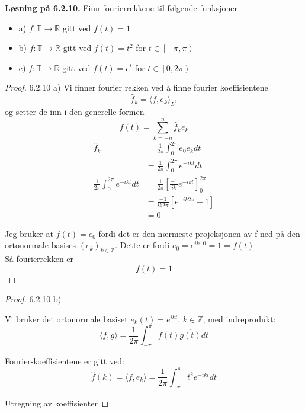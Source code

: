 \documentclass[a4paper,norsk]{article}
\newenvironment{oppgave}[1]%
	{\trivlist{}\item\relax\textbf{Løsning på #1.}\medspace}%
	{\endtrivlist}
\begin{document}
\begin{oppgave}{6.2.10}
Finn fourierrekkene til følgende funksjoner
\begin{itemize}
  \item a) $ f: \mathbb{T} \rightarrow \mathbb{R} $ gitt ved $ f(t) = 1 $  
  \item b) $ f: \mathbb{T} \rightarrow \mathbb{R} $ gitt ved $ f(t) = t^2 $ for $ t \in \left[ -\pi, \pi \right)  $   
  \item c) $ f: \mathbb{T} \rightarrow \mathbb{R} $ gitt ved $ f(t) = e^{t}  $ for $ t \in \left[ 0, 2 \pi \right) $ 
\end{itemize}


\begin{proof}{6.2.10 a)}
Vi finner fourier rekken ved å finne fourier koeffisientene
\[
    \hat{f}_k = \langle f, e_k \rangle_{ L^2 } 
\]
og setter de inn i den generelle formen
\[
    f(t) = \sum_{ k =-n }^{ n } \hat{f}_k e_k
\]
\begin{align*}
  \hat{f}_k &= \frac{ 1 }{ 2 \pi } \int_{0}^{2 \pi 
  } e_0 \overline{e_k} dt \\
  &= \frac{ 1 }{ 2 \pi  }  \int_{0}^{2 \pi } e^{-ikt} dt \\  
  \frac{ 1 }{ 2 \pi  } \int_{0 }^{2 \pi } e^{-ikt} dt &=   \frac{ 1 }{ 2 \pi  } \left[ \frac{ -1 }{ ik } e^{-ikt}  \right]  _0^{2 \pi } \\
  &= \frac{ -1 }{ ik 2 \pi  } \left[ e^{-ik2 \pi } - 1  \right] \\
  &= 0
\end{align*}

Jeg bruker at $ f(t) = e_0 $ fordi det er den nærmeste projeksjonen av f ned på den ortonormale basises $ \left( e_k \right) _{k \in \mathbb{Z}} $. Dette er fordi $ e_0 = e^{ik \cdot 0} = 1 = f(t)  $\\

Så fourierrekken er \[
    f(t) = 1
\]

\end{proof}

\begin{proof}{6.2.10 b)}


Vi bruker det ortonormale basiset $e_k(t) = e^{ikt}$, $k \in \mathbb{Z}$, med indreprodukt:
\[
\langle f, g \rangle = \frac{1}{2\pi} \int_{-\pi}^{\pi} f(t) \overline{g(t)}  dt
\]

Fourier-koeffisientene er gitt ved:
\[
\hat{f}(k) = \langle f, e_k \rangle = \frac{1}{2\pi} \int_{-\pi}^{\pi} t^2 e^{-ikt}  dt
\]

Utregning av koeffisienter


\end{proof}
\end{oppgave}
\end{document}
